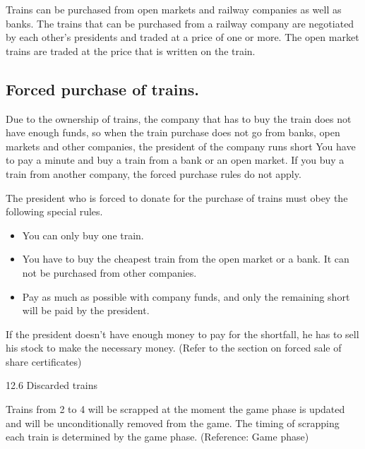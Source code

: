 \documentclass{article}
\begin{document}
\begin{CJK}{UTF8}{min}
Trains can be purchased from open markets and railway companies as
well as banks. The trains that can be purchased from a railway company
are negotiated by each other's presidents and traded at a price of one
or more. The open market trains are traded at the price that is
written on the train.

\subsection{Forced purchase of trains.}

Due to the ownership of trains, the company that has to buy the train
does not have enough funds, so when the train purchase does not go
from banks, open markets and other companies, the president of the
company runs short You have to pay a minute and buy a train from a
bank or an open market. If you buy a train from another company, the
forced purchase rules do not apply.

The president who is forced to donate for the purchase of trains must
obey the following special rules.
\begin{itemize}
\item You can only buy one train.
\item You have to buy the cheapest train from the open market or a
  bank. It can not be purchased from other companies.
\item Pay as much as possible with company funds, and only the
  remaining short will be paid by the president.
\end{itemize}
If the president doesn't have enough money to pay for the shortfall,
he has to sell his stock to make the necessary money. (Refer to the
section on forced sale of share certificates)

12.6 Discarded trains

Trains from 2 to 4 will be scrapped at the moment the game phase is
updated and will be unconditionally removed from the game. The timing
of scrapping each train is determined by the game phase. (Reference:
Game phase)






\end{CJK}
\end{document}
